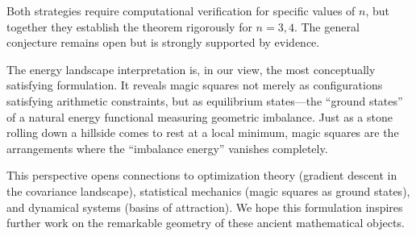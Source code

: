 \documentclass[11pt]{article}
\theoremstyle{definition}
\theoremstyle{remark}
\begin{document}
Both strategies require computational verification for specific values of $n$, but together they establish the theorem rigorously for $n = 3, 4$. The general conjecture remains open but is strongly supported by evidence.

The energy landscape interpretation is, in our view, the most conceptually satisfying formulation. It reveals magic squares not merely as configurations satisfying arithmetic constraints, but as equilibrium states---the ``ground states'' of a natural energy functional measuring geometric imbalance. Just as a stone rolling down a hillside comes to rest at a local minimum, magic squares are the arrangements where the ``imbalance energy'' vanishes completely.

This perspective opens connections to optimization theory (gradient descent in the covariance landscape), statistical mechanics (magic squares as ground states), and dynamical systems (basins of attraction). We hope this formulation inspires further work on the remarkable geometry of these ancient mathematical objects.
\end{document}
